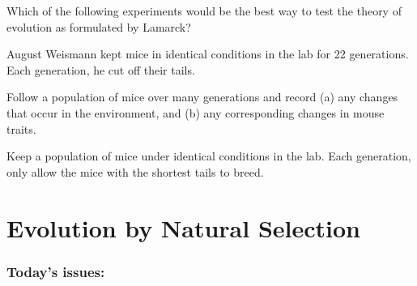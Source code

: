 \begin{noheadline}
\begin{frame}
    \begin{clickerquestion}
        \item Which of the following experiments would be the best way to test
            the theory of evolution as formulated by Lamarck?
 
        \begin{clickeroptions}
            \item August Weismann kept mice in identical conditions in the lab
                for 22 generations. Each generation, he cut off their tails.

            \item Follow a population of mice over many generations and record
                (a) any changes that occur in the environment, and (b) any
                corresponding changes in mouse traits. 

            \item {}

            \item Keep a population of mice under identical conditions in the
                lab. Each generation, only allow the mice with the shortest
                tails to breed. 
        \end{clickeroptions}
    \end{clickerquestion}
\end{frame}
\end{noheadline}

\section{Evolution by Natural Selection}

\begin{noheadline}
\begin{frame}
\frametitle{Today's issues:}
\tableofcontents
\end{frame}
\end{noheadline}

